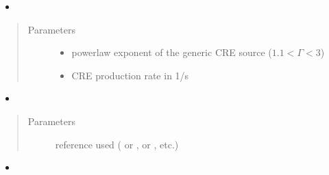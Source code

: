 \documentclass[letterpaper,10pt,english]{sphinxmanual}
\begin{document}
\begin{fulllineitems}
\begin{quote}
\begin{description}
\begin{itemize}
\end{itemize}

\end{description}\end{quote}
\begin{itemize}
\item {} 
\sphinxAtStartPar
{}

\end{itemize}
\begin{quote}\begin{description}
\item[{Parameters}] \leavevmode\begin{itemize}
\item {} 
\sphinxAtStartPar
{} \textendash{} power\sphinxhyphen{}law exponent of the generic CRE source (\(1.1 < \Gamma < 3\))

\item {} 
\sphinxAtStartPar
{} \textendash{} CRE production rate in 1/s

\end{itemize}

\end{description}\end{quote}
\begin{itemize}
\item {} 
\sphinxAtStartPar
{}

\end{itemize}
\begin{quote}\begin{description}
\item[{Parameters}] \leavevmode
\sphinxAtStartPar
{} \textendash{} reference used ( or \sphinxcode{\sphinxupquote{\textquotesingle{}1309.2641\textquotesingle{}}},  or \sphinxcode{\sphinxupquote{\textquotesingle{}1408.0002\textquotesingle{}}}, etc.)

\end{description}\end{quote}
\begin{itemize}
\item {} 
\sphinxAtStartPar
{}


\end{itemize}
\end{fulllineitems}
\end{document}
